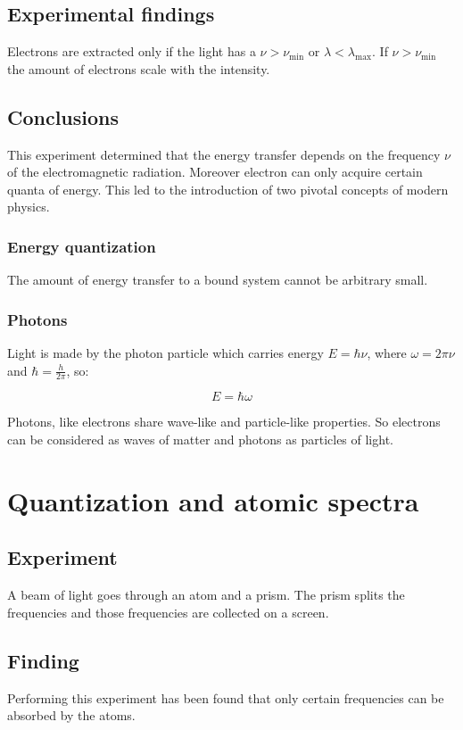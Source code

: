   \subsection{Experimental findings}
  Electrons are extracted only if the light has a $\nu > \nu_{\min}$ or $\lambda<\lambda_{\max}$.
  If $\nu>\nu_{\min}$ the amount of electrons scale with the intensity.

  \subsection{Conclusions}
  This experiment determined that the energy transfer depends on the frequency $\nu$ of the electromagnetic radiation.
  Moreover electron can only acquire certain quanta of energy.
  This led to the introduction of two pivotal  concepts of modern physics.

    \subsubsection{Energy quantization}
    The amount of energy transfer to a bound system cannot be arbitrary small.

    \subsubsection{Photons}
    Light is made by the photon particle which carries energy $E = \hbar\nu$, where $\omega = 2\pi\nu$ and $\hbar = \frac{h}{2\pi}$, so:

    $$E = \hbar\omega$$

    Photons, like electrons share wave-like and particle-like properties.
    So electrons can be considered as waves of matter and photons as particles of light.

\section{Quantization and atomic spectra}

  \subsection{Experiment}
  A beam of light goes through an atom and a prism.
  The prism splits the frequencies and those frequencies are collected on a screen.

  \subsection{Finding}
  Performing this experiment has been found that only certain frequencies can be absorbed by the atoms.


